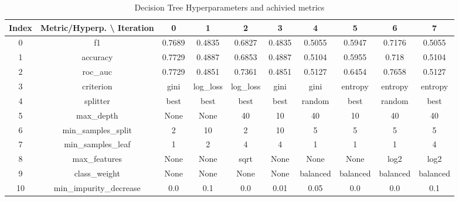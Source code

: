 \documentclass{article}%
\begin{document}
%


\begin{table}[h!]%
\caption{Decision Tree Hyperparameters and achivied metrics}%
\vspace{0.2cm}%
\centering%
\begin{tabular}{|c||c||c||c||c||c||c||c||c||c|}%
\hline%
Index&Metric/Hyperp. \textbackslash{} Iteration&0&1&2&3&4&5&6&7\\%
\hline%
0&f1&0.7689&0.4835&0.6827&0.4835&0.5055&0.5947&0.7176&0.5055\\%
1&accuracy&0.7729&0.4887&0.6853&0.4887&0.5104&0.5955&0.718&0.5104\\%
2&roc\_auc&0.7729&0.4851&0.7361&0.4851&0.5127&0.6454&0.7658&0.5127\\%
3&criterion&gini&log\_loss&log\_loss&gini&gini&entropy&entropy&entropy\\%
4&splitter&best&best&best&best&random&best&random&best\\%
5&max\_depth&None&None&40&10&40&10&40&40\\%
6&min\_samples\_split&2&10&2&10&5&5&5&5\\%
7&min\_samples\_leaf&1&2&4&4&1&1&1&4\\%
8&max\_features&None&None&sqrt&None&None&None&log2&log2\\%
9&class\_weight&None&None&None&None&balanced&balanced&balanced&balanced\\%
10&min\_impurity\_decrease&0.0&0.1&0.0&0.01&0.05&0.0&0.0&0.1\\%
\hline%
\end{tabular}%
\end{table}

%
\end{document}
